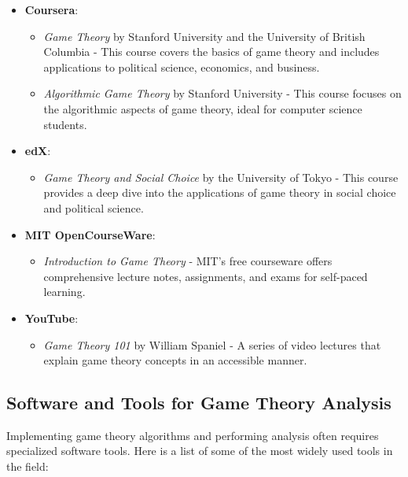 \documentclass[12pt]{book} %
\begin{document}
\begin{itemize}
    \item \textbf{Coursera}:
        \begin{itemize}
            \item \textit{Game Theory} by Stanford University and the University of British Columbia - This course covers the basics of game theory and includes applications to political science, economics, and business.
            \item \textit{Algorithmic Game Theory} by Stanford University - This course focuses on the algorithmic aspects of game theory, ideal for computer science students.
        \end{itemize}
    \item \textbf{edX}:
        \begin{itemize}
            \item \textit{Game Theory and Social Choice} by the University of Tokyo - This course provides a deep dive into the applications of game theory in social choice and political science.
        \end{itemize}
    \item \textbf{MIT OpenCourseWare}:
        \begin{itemize}
            \item \textit{Introduction to Game Theory} - MIT's free courseware offers comprehensive lecture notes, assignments, and exams for self-paced learning.
        \end{itemize}
    \item \textbf{YouTube}:
        \begin{itemize}
            \item \textit{Game Theory 101} by William Spaniel - A series of video lectures that explain game theory concepts in an accessible manner.
        \end{itemize}
\end{itemize}

\subsection{Software and Tools for Game Theory Analysis}
Implementing game theory algorithms and performing analysis often requires specialized software tools. Here is a list of some of the most widely used tools in the field:
\end{document}

